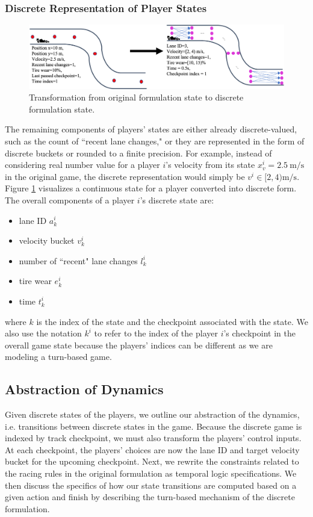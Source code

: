 \subsubsection{Discrete Representation of Player States}
\begin{figure}
\begin{center}
   \includegraphics[width=\textwidth]{Figures/StateTransformation.png}
\caption{Transformation from original formulation state to discrete formulation state.}
\label{fig:state_transform}
\end{center}
\end{figure}
The remaining components of players' states are either already discrete-valued, such as the count of ``recent lane changes," or they are represented in the form of discrete buckets or rounded to a finite precision. For example, instead of considering real number value for a player $i$'s velocity from its state $x^i_v=\SI{2.5}{\meter\per\second}$ in the original game, the discrete representation would simply be $v^i \in [2, 4)\si{\meter\per\second}$. Figure \ref{fig:state_transform} visualizes a continuous state for a player converted into discrete form. The overall components of a player $i$'s discrete state are:
\begin{itemize}
    \item lane ID $a^i_k$
    \item velocity bucket $v^i_k$
    \item number of ``recent" lane changes $l^i_k$
    \item tire wear $e^i_k$
    \item time $t^i_k$
\end{itemize}
where $k$ is the index of the state and the checkpoint associated with the state. We also use the notation $k^i$ to refer to the index of the player $i$'s checkpoint in the overall game state because the players' indices can be different as we are modeling a turn-based game.

\subsection{Abstraction of Dynamics} \label{section:discdyn}
Given discrete states of the players, we outline our abstraction of the dynamics, i.e. transitions between discrete states in the game. Because the discrete game is indexed by track checkpoint, we must also transform the players' control inputs. At each checkpoint, the players' choices are now the lane ID and target velocity bucket for the upcoming checkpoint. Next, we rewrite the constraints related to the racing rules in the original formulation as temporal logic specifications. We then discuss the specifics of how our state transitions are computed based on a given action and finish by describing the turn-based mechanism of the discrete formulation.


